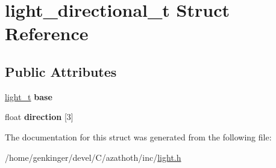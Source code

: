 \hypertarget{structlight__directional__t}{}\section{light\+\_\+directional\+\_\+t Struct Reference}
\label{structlight__directional__t}
\subsection*{Public Attributes}
\begin{DoxyCompactItemize}
\item 
\mbox{\label{structlight__directional__t_a917c689d25a0ac59c8e5dec3313a96cf}} 
\mbox{\hyperlink{structlight__t}{light\+\_\+t}} {\bfseries base}
\item 
\mbox{\label{structlight__directional__t_ad06870647a1173eb0b33f8d2f74893d7}} 
float {\bfseries direction} \mbox{[}3\mbox{]}
\end{DoxyCompactItemize}


The documentation for this struct was generated from the following file\+:\begin{DoxyCompactItemize}
\item 
/home/genkinger/devel/\+C/azathoth/inc/\mbox{\hyperlink{light_8h}{light.\+h}}\end{DoxyCompactItemize}

